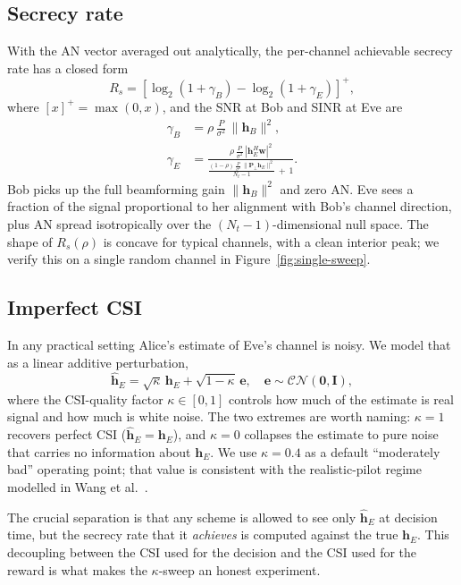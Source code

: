 \documentclass[conference]{IEEEtran}
\begin{document}
\subsection{Secrecy rate}
With the AN vector averaged out analytically, the per-channel
achievable secrecy rate has a closed form
\begin{equation}
R_s = \left[\log_2(1 + \gamma_B) - \log_2(1 + \gamma_E)\right]^+,
\label{eq:Rs}
\end{equation}
where $[x]^+ = \max(0, x)$, and the SNR at Bob and SINR at Eve are
\begin{align}
\gamma_B &= \rho\, \tfrac{P}{\sigma^2}\, \|\mathbf{h}_B\|^2, \\
\gamma_E &= \frac{\rho\, \tfrac{P}{\sigma^2}\, |\mathbf{h}_E^H \mathbf{w}|^2}
                  {\frac{(1-\rho)\, \tfrac{P}{\sigma^2}\, \|\mathbf{P}_\perp \mathbf{h}_E\|^2}{N_t - 1}\, +\, 1}.
\label{eq:gammaE}
\end{align}
Bob picks up the full beamforming gain $\|\mathbf{h}_B\|^2$ and zero
AN. Eve sees a fraction of the signal proportional to her alignment
with Bob's channel direction, plus AN spread isotropically over the
$(N_t - 1)$-dimensional null space. The shape of $R_s(\rho)$ is
concave for typical channels, with a clean interior peak; we verify
this on a single random channel in Figure~\ref{fig:single-sweep}.

\subsection{Imperfect CSI}
In any practical setting Alice's estimate of Eve's channel is noisy.
We model that as a linear additive perturbation,
\begin{equation}
\hat{\mathbf{h}}_E = \sqrt{\kappa}\, \mathbf{h}_E
                    + \sqrt{1-\kappa}\, \mathbf{e},
\quad \mathbf{e} \sim \mathcal{CN}(\mathbf{0}, \mathbf{I}),
\label{eq:csi-model}
\end{equation}
where the CSI-quality factor $\kappa \in [0, 1]$ controls how much of
the estimate is real signal and how much is white noise. The two
extremes are worth naming: $\kappa = 1$ recovers perfect CSI
($\hat{\mathbf{h}}_E = \mathbf{h}_E$), and $\kappa = 0$ collapses the
estimate to pure noise that carries no information about
$\mathbf{h}_E$. We use $\kappa = 0.4$ as a default ``moderately bad''
operating point; that value is consistent with the realistic-pilot
regime modelled in Wang et al.\ \cite{wang2019survey}.

The crucial separation is that any scheme is allowed to see only
$\hat{\mathbf{h}}_E$ at decision time, but the secrecy rate that it
\emph{achieves} is computed against the true $\mathbf{h}_E$. This
decoupling between the CSI used for the decision and the CSI used for
the reward is what makes the $\kappa$-sweep an honest experiment.
\end{document}
